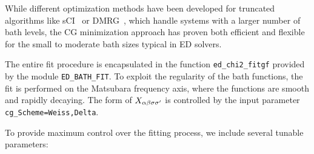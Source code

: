 \documentclass[edipack_sp.tex]{subfiles}
\begin{document}
While different optimization methods have been developed for 
truncated algorithms like sCI~\cite{Mejuto_Bath_ASCI-DMFT} or DMRG~\cite{dmrg}, 
which handle systems with a 
larger number of bath levels, the CG minimization approach has proven 
both efficient and flexible for the small to moderate bath sizes 
typical in ED solvers. 

The entire fit procedure is encapsulated in the function 
\texttt{ed\_chi2\_fitgf} provided by the module 
\texttt{ED\_BATH\_FIT}. To exploit the regularity of the bath functions, 
the fit is performed on the Matsubara frequency axis, where the functions 
are smooth and rapidly decaying. The form of $X_{\alpha\beta\sigma\sigma'}$ is controlled 
by the input parameter \texttt{cg\_Scheme=Weiss,Delta}.

To provide maximum control over the fitting process, we include several 
tunable parameters:
\end{document}
